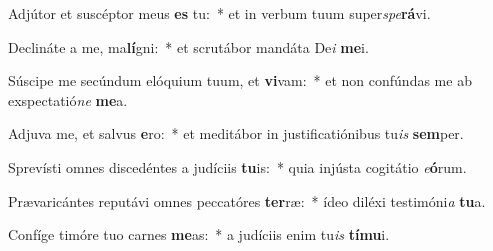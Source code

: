 \item Adjútor et suscéptor meus \textbf{es} tu:~* et in verbum tuum super\textit{spe}\textbf{rá}vi.
\item Declináte a me, ma\textbf{lí}gni:~* et scrutábor mandáta De\textit{i} \textbf{me}i.
\item Súscipe me secúndum elóquium tuum, et \textbf{vi}vam:~* et non confúndas me ab exspectatió\textit{ne} \textbf{me}a.
\item Adjuva me, et salvus \textbf{e}ro:~* et meditábor in justificatiónibus tu\textit{is} \textbf{sem}per.
\item Sprevísti omnes discedéntes a judíciis \textbf{tu}is:~* quia injústa cogitátio \textit{e}\textbf{ó}rum.
\item Prævaricántes reputávi omnes peccatóres \textbf{ter}ræ:~* ídeo diléxi testimóni\textit{a} \textbf{tu}a.
\item Confíge timóre tuo carnes \textbf{me}as:~* a judíciis enim tu\textit{is} \textbf{tí}\textbf{mu}i.
